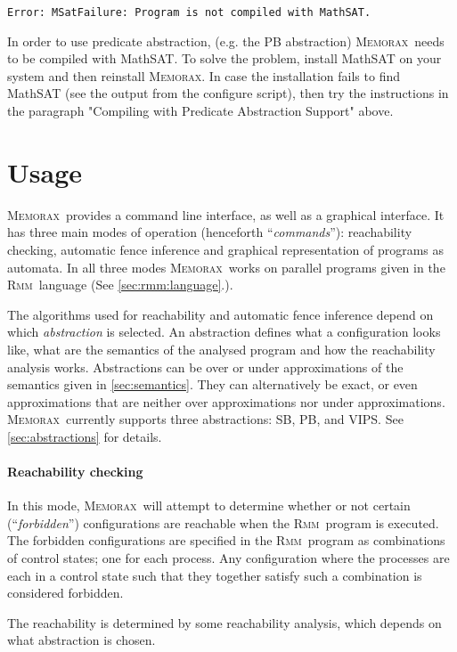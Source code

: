 \documentclass[a4paper]{article}
\newcommand{\memorax}{\textsc{Memorax}}
\newcommand{\rmm}{\textsc{Rmm}}
\begin{document}
\begin{verbatim}
Error: MSatFailure: Program is not compiled with MathSAT.
\end{verbatim}

   In order to use predicate abstraction, (e.g. the PB abstraction)
   \memorax\ needs to be compiled with MathSAT. To solve the problem,
   install MathSAT on your system and then reinstall \memorax. In case
   the installation fails to find MathSAT (see the output from the
   configure script), then try the instructions in the paragraph
   "Compiling with Predicate Abstraction Support" above.

\section{Usage}\label{sec:usage}

\memorax\ provides a command line interface, as well as a graphical
interface. It has three main modes of operation (henceforth
``\emph{commands}''): reachability checking, automatic fence inference
and graphical representation of programs as automata. In all three
modes \memorax\ works on parallel programs given in the \rmm\ language
(See \cref{sec:rmm:language}.).

The algorithms used for reachability and automatic fence inference
depend on which \emph{abstraction} is selected. An abstraction defines
what a configuration looks like, what are the semantics of the
analysed program and how the reachability analysis works. Abstractions
can be over or under approximations of the semantics given in
\cref{sec:semantics}. They can alternatively be exact, or even
approximations that are neither over approximations nor under
approximations. \memorax\ currently supports three abstractions: SB,
PB, and VIPS. See \cref{sec:abstractions} for details.

\paragraph{Reachability checking}
 In this mode, \memorax\ will attempt to determine whether or not
 certain (``\emph{forbidden}'') configurations are reachable when the
 \rmm\ program is executed. The forbidden configurations are specified
 in the \rmm\ program as combinations of control states; one for each
 process. Any configuration where the processes are each in a control
 state such that they together satisfy such a combination is
 considered forbidden.

 The reachability is determined by some reachability analysis, which
 depends on what abstraction is chosen.
\end{document}
